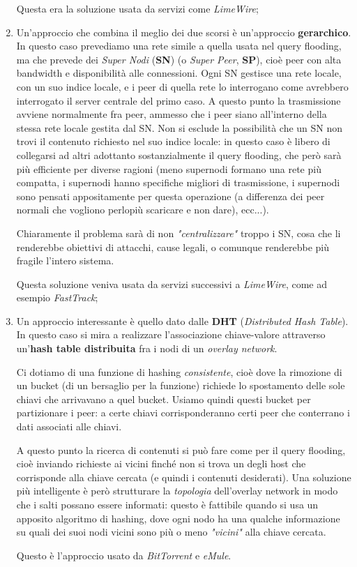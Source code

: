 \documentclass[a4paper,11pt]{article}
\begin{document}
\begin{enumerate}
		Questa era la soluzione usata da servizi come \textit{LimeWire};

	\item Un'approccio che combina il meglio dei due scorsi è un'approccio \textbf{gerarchico}.
		In questo caso prevediamo una rete simile a quella usata nel query flooding, ma che prevede dei \textit{Super Nodi} (\textbf{SN}) (o \textit{Super Peer}, \textbf{SP}), cioè peer con alta bandwidth e disponibilità alle connessioni.
		Ogni SN gestisce una rete locale, con un suo indice locale, e i peer di quella rete lo interrogano come avrebbero interrogato il server centrale del primo caso.
		A questo punto la trasmissione avviene normalmente fra peer, ammesso che i peer siano all'interno della stessa rete locale gestita dal SN.
		Non si esclude la possibilità che un SN non trovi il contenuto richiesto nel suo indice locale: in questo caso è libero di collegarsi ad altri adottanto sostanzialmente il query flooding, che però sarà più efficiente per diverse ragioni (meno supernodi formano una rete più compatta, i supernodi hanno specifiche migliori di trasmissione, i supernodi sono pensati appositamente per questa operazione (a differenza dei peer normali che vogliono perlopiù scaricare e non dare), ecc...).

		Chiaramente il problema sarà di non \textit{"centralizzare"} troppo i SN, cosa che li renderebbe obiettivi di attacchi, cause legali, o comunque renderebbe più fragile l'intero sistema.

		Questa soluzione veniva usata da servizi successivi a \textit{LimeWire}, come ad esempio \textit{FastTrack};

	\item Un approccio interessante è quello dato dalle \textbf{DHT} (\textit{Distributed Hash Table}).
	In questo caso si mira a realizzare l'associazione chiave-valore attraverso un'\textbf{hash table distribuita} fra i nodi di un \textit{overlay network}.
	
	Ci dotiamo di una funzione di hashing \textit{consistente}, cioè dove la rimozione di un bucket (di un bersaglio per la funzione) richiede lo spostamento delle sole chiavi che arrivavano a quel bucket.
	Usiamo quindi questi bucket per partizionare i peer: a certe chiavi corrisponderanno certi peer che conterrano i dati associati alle chiavi.

	A questo punto la ricerca di contenuti si può fare come per il query flooding, cioè inviando richieste ai vicini finché non si trova un degli host che corrisponde alla chiave cercata (e quindi i contenuti desiderati).
	Una soluzione più intelligente è però strutturare la \textit{topologia} dell'overlay network in modo che i salti possano essere informati: questo è fattibile quando si usa un apposito algoritmo di hashing, dove ogni nodo ha una qualche informazione su quali dei suoi nodi vicini sono più o meno \textit{"vicini"} alla chiave cercata. 

		Questo è l'approccio usato da \textit{BitTorrent} e \textit{eMule}.
\end{enumerate}
\end{document}
